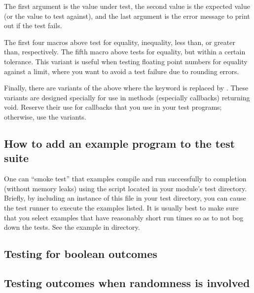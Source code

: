 \documentclass[letterpaper,10pt,english]{sphinxmanual}
\renewcommand{\sphinxcode}[1]{\texttt{\small{#1}}}
\begin{document}
The first argument \sphinxcode{} is the value under test, the second value
\sphinxcode{} is the expected value (or the value to test against), and the
last argument \sphinxcode{} is the error message to print out if the test fails.

The first four macros above test for equality, inequality, less than, or
greater than, respectively.  The fifth macro above tests for equality,
but within a certain tolerance.  This variant is useful when testing
floating point numbers for equality against a limit, where you want to
avoid a test failure due to rounding errors.

Finally, there are variants of the above where the keyword \sphinxcode{}
is replaced by \sphinxcode{}.  These variants are designed specially for
use in methods (especially callbacks) returning void.  Reserve their
use for callbacks that you use in your test programs; otherwise,
use the \sphinxcode{} variants.


\subsection{How to add an example program to the test suite}
\label{\detokenize{how-to-write-tests:how-to-add-an-example-program-to-the-test-suite}}
One can “smoke test” that examples compile and run successfully
to completion (without memory leaks) using the \sphinxcode{\sphinxupquote{examples\sphinxhyphen{}to\sphinxhyphen{}run.py}}
script located in your module’s test directory.  Briefly, by including
an instance of this file in your test directory, you can cause the
test runner to execute the examples listed.  It is usually best to make
sure that you select examples that have reasonably short run times so as
to not bog down the tests.  See the example in \sphinxcode{}
directory.


\subsection{Testing for boolean outcomes}
\label{\detokenize{how-to-write-tests:testing-for-boolean-outcomes}}

\subsection{Testing outcomes when randomness is involved}
\label{\detokenize{how-to-write-tests:testing-outcomes-when-randomness-is-involved}}
\end{document}
